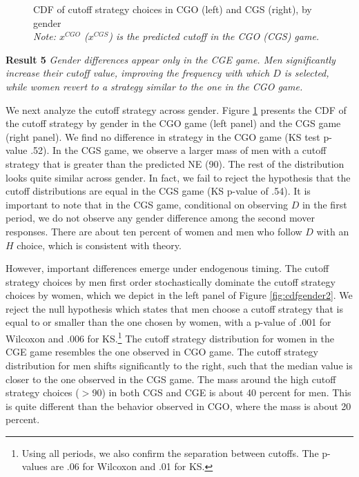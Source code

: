 \documentclass[12pt, letterpaper]{article}
\theoremstyle{plain}
\begin{document}
\begin{center}
\begin{figure}[ht]
\centering{}%
\begin{minipage}[t]{0.45\columnwidth}%
%
\end{minipage}%
\begin{minipage}[t]{0.45\columnwidth}%
%
\end{minipage} 
\caption{CDF of cutoff strategy choices in CGO (left) and CGS (right), by gender \\\footnotesize{\textit{Note: $x^{CGO}$ ($x^{CGS}$) is the predicted cutoff in the CGO (CGS) game.}} }
\label{fig:cdfgender1}\end{figure}
\par\end{center}

\noindent \textbf{Result 5}
\textit{Gender differences appear only in the CGE game. Men significantly increase their cutoff value, improving the frequency with which $D$ is selected, while women revert to a strategy similar to the one in the CGO game.}

We next analyze the cutoff strategy across gender. Figure \ref{fig:cdfgender1} presents the CDF of the cutoff strategy by gender in the CGO game (left panel) and the CGS  game (right panel). We find no difference in strategy in the CGO game (KS test p-value .52). In the CGS game, we observe a larger mass of men with a cutoff strategy that is greater than the predicted NE (90). The rest of the distribution looks quite similar across gender. In fact, we fail to reject the hypothesis that the cutoff distributions are equal in the CGS game (KS p-value of .54). It is important to note that in the CGS game, conditional on observing $D$ in the first period, we do not observe any gender difference among the second mover responses. There are about ten percent of women and men who follow $D$ with an $H$ choice, which is consistent with theory.

However, important differences emerge under endogenous timing. The cutoff strategy choices by men first order stochastically dominate the cutoff strategy choices by women, which we depict in the left panel of Figure \ref{fig:cdfgender2}. We reject the null hypothesis which states that men choose a cutoff strategy that is equal to or smaller than the one chosen by women, with a p-value of .001 for Wilcoxon and .006 for KS.\footnote{Using all periods, we also confirm the separation between cutoffs. The p-values are .06 for Wilcoxon and .01 for KS.} The cutoff strategy distribution for women in the CGE game resembles the one observed in CGO game. The cutoff strategy distribution for men shifts significantly to the right, such that the median value is closer to the one observed in the CGS game. The mass around the high cutoff strategy choices ($>$90) in both CGS and CGE is about 40 percent for men. This is quite different than the behavior observed in CGO, where the mass is about 20 percent. 
\end{document}
